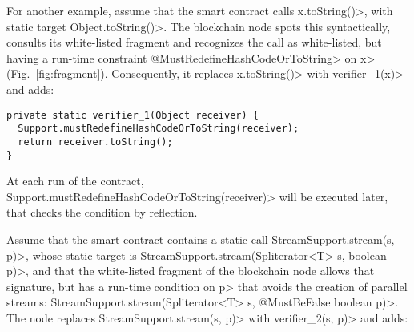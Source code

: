 

For another example, assume that the smart contract calls
\<x.toString()>, with static target \<Object.toString()>.
The blockchain node spots this syntactically,
consults its white-listed fragment and recognizes the call as
white-listed, but having a run-time constraint \<@MustRedefineHashCodeOrToString> on
\<x> (Fig.~\ref{fig:fragment}).
Consequently, it replaces \<x.toString()> with \<verifier\_1(x)> and adds:

{\small\begin{verbatim}
private static verifier_1(Object receiver) {
  Support.mustRedefineHashCodeOrToString(receiver);
  return receiver.toString();
}
\end{verbatim}}

\noindent
At each run of the contract,
\<Support.mustRedefineHashCodeOrToString(receiver)> will be executed later,
that checks the condition by reflection.

Assume that the smart contract contains a static call
\<StreamSupport.stream(s, p)>, whose static target is
\<StreamSupport.stream(Spliterator$\text{<}$T$\text{>}$ s, boolean p)>,
and that the white-listed fragment of the blockchain node allows that signature,
but has a run-time condition on \<p> that avoids the creation of parallel streams:
\<StreamSupport.stream(Spliterator$\text{<}$T$\text{>}$ s, @MustBeFalse boolean p)>.
The node replaces \<StreamSupport.stream(s, p)> with \<verifier\_2(s, p)> and adds:

